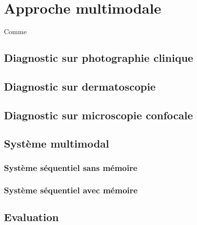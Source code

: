 \chapter{Approche multimodale}
\label{chap:chapter_7}
\chapterintro
Comme 	
\newpage

\section{Diagnostic sur photographie clinique}
\section{Diagnostic sur dermatoscopie}
\section{Diagnostic sur microscopie confocale}
\section{Système multimodal}
\subsection{Système séquentiel sans mémoire}
\subsection{Système séquentiel avec mémoire}
\section{Evaluation}